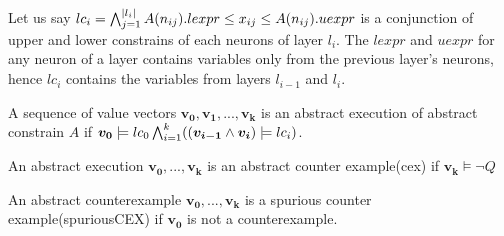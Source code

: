 Let us say $lc_i = \bigwedge_{j=1}^{|l_i|} A(n_{ij}).lexpr \leq x_{ij} \leq  A(n_{ij}).uexpr$ is a 
conjunction of upper and lower constrains of each neurons of layer $l_i$.
The $lexpr$ and $uexpr$ for any neuron of a layer contains variables only from the previous layer's neurons, 
hence $lc_i$ contains the variables from layers $l_{i-1}$ and $l_i$. 

\begin{df}
  A sequence of value vectors $\boldsymbol{v_0}, \boldsymbol{v_1}, ... , \boldsymbol{v_k}$ is an 
  abstract execution of abstract constrain $A$ if 
  $\boldsymbol{v_0} \models lc_0 \bigwedge_{i=1}^{k} ((\boldsymbol{v_{i-1}} \land \boldsymbol{v_i}) \models lc_i)$.  
\end{df}


\begin{df}
  An abstract execution $\boldsymbol{v_0,...,v_k}$ is
  an abstract counter example(cex) if $\boldsymbol{v_k} \models \lnot Q$
\end{df}

\begin{df}
  An abstract counterexample $\boldsymbol{v_0,...,v_k}$ is a
  spurious counter example(spuriousCEX) if $\boldsymbol{v_0}$ is not a counterexample.
\end{df}









